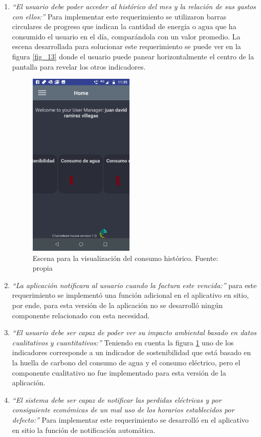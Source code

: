 \begin{enumerate}
	\item \textit{``El usuario debe poder acceder al histórico del mes y la relación de sus gastos con ellos:''} Para implementar este requerimiento se utilizaron barras circulares de progreso que indican la cantidad de energia o agua que ha consumido el usuario en el día, comparándola con un valor promedio. La escena desarrollada para solucionar este requerimiento se puede ver en la figura \ref{fig_13} donde el usuario puede panear horizontalmente el centro de la pantalla para revelar los otros indicadores.
	\begin{figure}[htbp]
		\centerline{\includegraphics[width=5cm]{./figuras/mobile_home.jpeg}}
		\caption{Escena para la visualización del consumo histórico. Fuente: propia}
		\label{fig_14}
	\end{figure}
	\item  \textit{``La aplicación notificara al usuario cuando la factura este vencida:''} para este requerimiento se implementó una función adicional en el aplicativo en sitio, por ende, para esta versión de la aplicación no se desarrolló ningún componente relacionado con esta necesidad.
	
	\item \textit{``El usuario debe ser capaz de poder ver su impacto ambiental basado en datos cualitativos y cuantitativos:''} Teniendo en cuenta la figura \ref{fig_14} uno de los indicadores corresponde a un indicador de sostenibilidad que está basado en la huella de carbono del consumo de agua y el consumo eléctrico, pero el componente cualitativo no fue implementado para esta versión de la aplicación.
	
	\item \textit{``El sistema debe ser capaz de notificar las perdidas eléctricas y por consiguiente económicas de un mal uso de los horarios establecidos por defecto:''} Para implementar este requerimiento se desarrolló en el aplicativo en sitio la función de notificación automática.
	
\end{enumerate}


